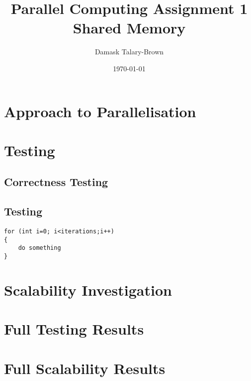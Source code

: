 \documentclass[12pt]{article}
\title{\textbf{Parallel Computing Assignment 1 \\ Shared Memory}}
\author{Damask Talary-Brown}
\date{\today}
\begin{document}
\maketitle

\tableofcontents
\listoffigures
\listoftables

\clearpage
\section{Approach to Parallelisation}



\clearpage
\section{Testing}

\subsection{Correctness Testing}

\subsection{Testing}

\lstset {language=C}
\begin{lstlisting}
for (int i=0; i<iterations;i++)
{
	do something
}
\end{lstlisting}

\clearpage
\section{Scalability Investigation}


\clearpage



\begin{appendices}

\clearpage
\section{Full Testing Results}

\clearpage
\section{Full Scalability Results}
	
\end{appendices}
\end{document}
